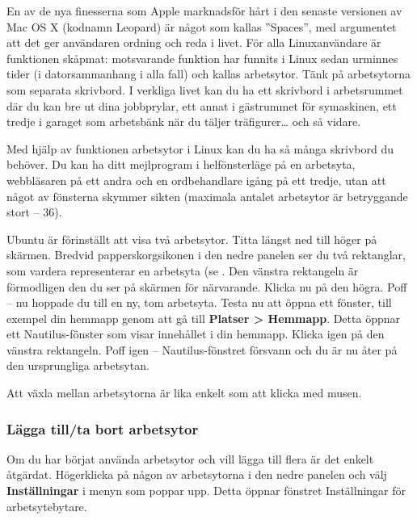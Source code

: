 \documentclass[a4paper,final]{memoir} %
\begin{document}

En av de nya finesserna som Apple marknadsför hårt i den senaste versionen av Mac OS X (kodnamn Leopard) är något som kallas ''Spaces'', med argumentet att det ger användaren ordning och reda i livet. För alla Linuxanvändare är funktionen skåpmat: motsvarande funktion har funnits i Linux sedan urminnes tider (i datorsammanhang i alla fall) och kallas arbetsytor. Tänk på arbetsytorna som separata skrivbord. I verkliga livet kan du ha ett skrivbord i arbetsrummet där du kan bre ut dina jobbprylar, ett annat i gästrummet för symaskinen, ett tredje i garaget som arbetsbänk när du täljer träfigurer\ldots{} och så vidare. 

Med hjälp av funktionen arbetsytor i Linux kan du ha så många skrivbord du behöver. Du kan ha ditt mejlprogram i helfönsterläge på en arbetsyta, webbläsaren på ett andra och en ordbehandlare igång på ett tredje, utan att något av fönsterna skymmer sikten (maximala antalet arbetsytor är betryggande stort -- 36).


Ubuntu är förinställt att visa två arbetsytor. Titta längst ned till höger på skärmen. Bredvid papperskorgsikonen i den nedre panelen ser du två rektanglar, som vardera representerar en arbetsyta (se . Den vänstra rektangeln är förmodligen den du ser på skärmen för närvarande. Klicka nu på den högra. Poff -- nu hoppade du till en ny, tom arbetsyta. Testa nu att öppna ett fönster, till exempel din hemmapp genom att gå till \textbf{Platser \textgreater{} Hemmapp}. Detta öppnar ett Nautilus-fönster som visar innehållet i din hemmapp. Klicka igen på den vänstra rektangeln. Poff igen -- Nautilus-fönstret försvann och du är nu åter på den ursprungliga arbetsytan.

Att växla mellan arbetsytorna är lika enkelt som att klicka med musen. 


\subsubsection{Lägga till/ta bort arbetsytor}

Om du har börjat använda arbetsytor och vill lägga till flera är det enkelt åtgärdat. Högerklicka på någon av arbetsytorna i den nedre panelen och välj \textbf{Inställningar} i menyn som poppar upp. Detta öppnar fönstret Inställningar för arbetsytebytare.
\end{document}
